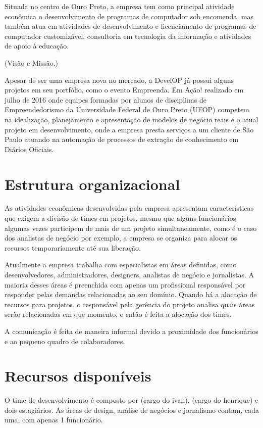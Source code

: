 \documentclass[
	12pt,				%
	openright,			%
	twoside,			%
	a4paper,			%
	english,			%
	french,				%
	spanish,			%
	brazil,				%
	]{abntex2}
\begin{document}
Situada no centro de Ouro Preto, a empresa tem como principal atividade econômica o desenvolvimento de programas de computador sob encomenda, mas também atua em atividades de desenvolvimento e licenciamento de programas de computador customizável, consultoria em tecnologia da informação e atividades de apoio à educação.

(Visão e Missão.)

Apesar de ser uma empresa nova no mercado, a DevelOP já possui alguns projetos em seu portfólio, como o evento Empreenda. Em Ação! realizado em julho de 2016 onde equipes formadas por alunos de disciplinas de Empreendedorismo da Universidade Federal de Ouro Preto (UFOP) competem na idealização, planejamento e apresentação de modelos de negócio reais e o atual projeto em desenvolvimento, onde a empresa presta serviços a um cliente de São Paulo atuando na automação de processos de extração de conhecimento em Diários Oficiais.

\section{Estrutura organizacional}

As atividades econômicas desenvolvidas pela empresa apresentam características que exigem a divisão de times em projetos, mesmo que alguns funcionários algumas vezes participem de mais de um projeto simultaneamente, como é o caso dos analistas de negócio por exemplo, a empresa se organiza para alocar os recursos temporariamente até sua liberação.

Atualmente a empresa trabalha com especialistas em áreas definidas, como desenvolvedores, administradores, designers, analistas de negócio e jornalistas. A maioria desses áreas é preenchida com apenas um profissional responsável por responder pelas demandas relacionadas ao seu domínio. Quando há a alocação de recursos para projetos, o responsável pela gerência do projeto analisa quais áreas serão relacionadas em que momento, e então é feita a alocação dos times.

A comunicação é feita de maneira informal devido a proximidade dos funcionários e ao pequeno quadro de colaboradores.

\section{Recursos disponíveis}

O time de desenvolvimento é composto por (cargo do ivan), (cargo do henrique) e dois estagiários. As áreas de design, análise de negócios e jornalismo contam, cada uma, com apenas 1 funcionário.
\end{document}
